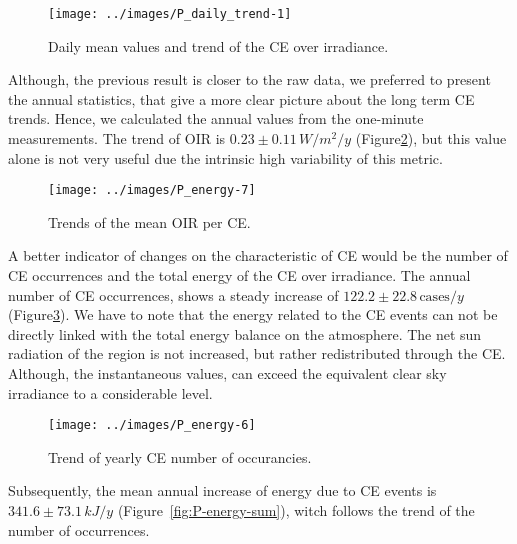 \documentclass[
]{article}
\begin{document}
\begin{figure}[h!]

{\centering \texttt{[image: ../images/P\_daily\_trend-1]} 

}

\caption{Daily mean values and trend of the CE over irradiance.}\label{fig:CEmeanDaily}
\end{figure}

Although, the previous result is closer to the raw data, we preferred to present the
annual statistics, that give a more clear picture about the long term CE trends.
Hence, we calculated the annual values from the one-minute measurements. The trend of
OIR is
\(0.23\pm 0.11\,W/m^2/y\)
(Figure\nobreakspace{}\ref{fig:P-energy-mean}),
but this value alone is not very useful due the intrinsic high variability of this
metric.

\begin{figure}[h!]

{\centering \texttt{[image: ../images/P\_energy-7]} 

}

\caption{Trends of the mean OIR per CE.}\label{fig:P-energy-mean}
\end{figure}

A better indicator of changes on the characteristic of CE would be the number of CE
occurrences and the total energy of the CE over irradiance. The annual number of CE
occurrences, shows a steady increase of
\(122.2\pm 22.8\,\text{cases}/y\)
(Figure\nobreakspace{}\ref{fig:P-energy-N}).
We have to note that the energy related to the CE events can not be directly linked
with the total energy balance on the atmosphere. The net sun radiation of the region
is not increased, but rather redistributed through the CE. Although, the
instantaneous values, can exceed the equivalent clear sky irradiance to a
considerable level.

\begin{figure}[h!]

{\centering \texttt{[image: ../images/P\_energy-6]} 

}

\caption{Trend of yearly CE number of occurancies.}\label{fig:P-energy-N}
\end{figure}

Subsequently, the mean annual increase of energy due to CE events is
\(341.6\pm 73.1\,kJ/y\)
(Figure~\ref{fig:P-energy-sum}), witch follows the trend of the number of
occurrences.
\end{document}
